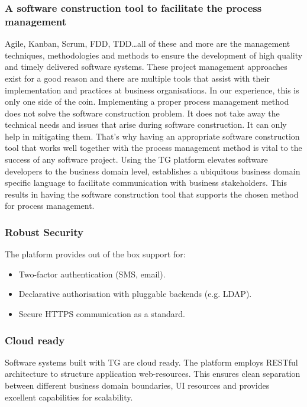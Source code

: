 \documentclass[a4paper,10pt,twocolumn,oneside,openright,final]{memoir}
\begin{document}
	
\subsubsection*{A software construction tool to facilitate the process management}
	Agile, Kanban, Scrum, FDD, TDD\ldots all of these and more are the management techniques, methodologies and methods to ensure the development of high quality and timely delivered software systems.
	These project management approaches exist for a good reason and there are multiple tools that assist with their implementation and practices at business organisations.
	In our experience, this is only one side of the coin.
	Implementing a proper process management method does not solve the software construction problem.
	It does not take away the technical needs and issues that arise during software construction.
	It can only help in mitigating them.
	That's why having an appropriate software construction tool that works well together with the process management method is vital to the success of any software project.
	Using the TG platform elevates software developers to the business domain level, establishes a ubiquitous business domain specific language to facilitate communication with business stakeholders.
	This results in having the software construction tool that supports the chosen method for process management.


\subsubsection*{Robust Security}
	The platform provides out of the box support for:
  \begin{itemize}    
    \item Two-factor authentication (SMS, email).
    \item Declarative authorisation with pluggable backends (e.g. LDAP). 
    \item Secure HTTPS communication as a standard.
\end{itemize}
    
    
\subsubsection*{Cloud ready}
	Software systems built with TG are cloud ready.
	The platform employs RESTful architecture to structure application web-resources.
	This ensures clean separation between different business domain boundaries, UI resources and provides excellent capabilities for scalability.
\end{document}
